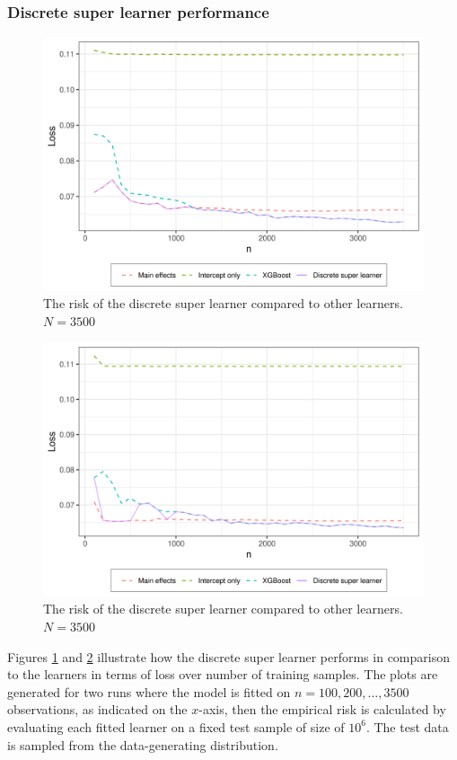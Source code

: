 \documentclass[./main.tex]{subfiles}
\begin{document}
\subsubsection{Discrete super learner performance}
\begin{figure}[H]
    \centering
    \includegraphics[width=\textwidth]{figures/dsl_loss.png}
    \caption{The risk of the discrete super learner compared to other learners. $ N = 3500 $} 
    \label{fig:loss_min_of_both}
\end{figure}


\begin{figure}[H]
    \centering
    \includegraphics[width=\textwidth]{figures/dsl_loss_jumps.png}
    \caption{The risk of the discrete super learner compared to other learners. $ N = 3500 $}
    \label{fig:loss_jumps}
\end{figure}
Figures \ref{fig:loss_min_of_both} and \ref{fig:loss_jumps} illustrate how the discrete super learner performs in comparison to the learners in terms of loss over number of training samples. The plots are generated for two runs where the model is fitted on $ n = 100, 200, \dots , 3500 $ observations, as indicated on the $ x $-axis, then the empirical risk is calculated by evaluating each fitted learner on a fixed test sample of size of $ 10^{6} $. The test data is sampled from the data-generating distribution.  
\end{document}
